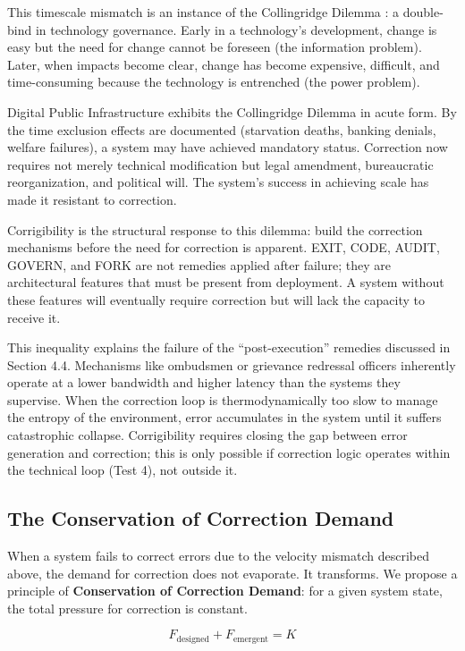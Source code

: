 \documentclass{article}
\begin{document}
This timescale mismatch is an instance of the Collingridge Dilemma \citep{collingridge1980}: a double-bind in technology governance. Early in a technology's development, change is easy but the need for change cannot be foreseen (the information problem). Later, when impacts become clear, change has become expensive, difficult, and time-consuming because the technology is entrenched (the power problem).

Digital Public Infrastructure exhibits the Collingridge Dilemma in acute form. By the time exclusion effects are documented (starvation deaths, banking denials, welfare failures), a system may have achieved mandatory status. Correction now requires not merely technical modification but legal amendment, bureaucratic reorganization, and political will. The system's success in achieving scale has made it resistant to correction.

Corrigibility is the structural response to this dilemma: build the correction mechanisms before the need for correction is apparent. EXIT, CODE, AUDIT, GOVERN, and FORK are not remedies applied after failure; they are architectural features that must be present from deployment. A system without these features will eventually require correction but will lack the capacity to receive it.

This inequality explains the failure of the ``post-execution'' remedies discussed in Section 4.4. Mechanisms like ombudsmen or grievance redressal officers inherently operate at a lower bandwidth and higher latency than the systems they supervise. When the correction loop is thermodynamically too slow to manage the entropy of the environment, error accumulates in the system until it suffers catastrophic collapse. Corrigibility requires closing the gap between error generation and correction; this is only possible if correction logic operates within the technical loop (Test 4), not outside it.

\subsection{The Conservation of Correction Demand}

When a system fails to correct errors due to the velocity mismatch described above, the demand for correction does not evaporate. It transforms. We propose a principle of \textbf{Conservation of Correction Demand}: for a given system state, the total pressure for correction is constant.

\begin{equation}
F_{\text{designed}} + F_{\text{emergent}} = K
\label{eq:conservation}
\end{equation}
\end{document}

